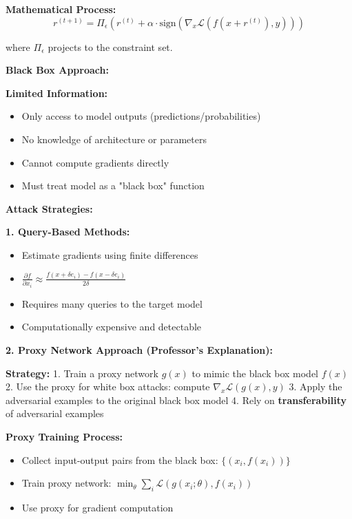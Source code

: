 \documentclass[12pt]{article}
\begin{document}
\begin{enumerate}[(a)]
{    \textbf{Mathematical Process:}
    $$r^{(t+1)} = \Pi_{\epsilon}\left(r^{(t)} + \alpha \cdot \text{sign}(\nabla_x \mathcal{L}(f(x + r^{(t)}), y))\right)$$
    
    where $\Pi_{\epsilon}$ projects to the constraint set.
    
    \textbf{Black Box Approach:}
    
    \textbf{Limited Information:}
    \begin{itemize}
        \item Only access to model outputs (predictions/probabilities)
        \item No knowledge of architecture or parameters
        \item Cannot compute gradients directly
        \item Must treat model as a "black box" function
    \end{itemize}
    
    \textbf{Attack Strategies:}
    
    \textbf{1. Query-Based Methods:}
    \begin{itemize}
        \item Estimate gradients using finite differences
        \item $\frac{\partial f}{\partial x_i} \approx \frac{f(x + \delta e_i) - f(x - \delta e_i)}{2\delta}$
        \item Requires many queries to the target model
        \item Computationally expensive and detectable
    \end{itemize}
    
    \textbf{2. Proxy Network Approach (Professor's Explanation):}
    
    \textbf{Strategy:}
    1. Train a proxy network $g(x)$ to mimic the black box model $f(x)$
    2. Use the proxy for white box attacks: compute $\nabla_x \mathcal{L}(g(x), y)$
    3. Apply the adversarial examples to the original black box model
    4. Rely on \textbf{transferability} of adversarial examples
    
    \textbf{Proxy Training Process:}
    \begin{itemize}
        \item Collect input-output pairs from the black box: $\{(x_i, f(x_i))\}$
        \item Train proxy network: $\min_\theta \sum_i \mathcal{L}(g(x_i; \theta), f(x_i))$
        \item Use proxy for gradient computation
    \end{itemize}
    
}
\end{enumerate}
\end{document}
